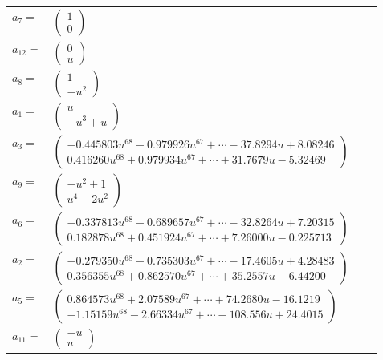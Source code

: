 \documentclass[1p]{elsarticle_modified}
\theoremstyle{definition}
\begin{document}
\begin{tabular}{m{7pt} m{180pt} m{7pt} m{180pt} }
\flushright $a_{7}=$&$\begin{pmatrix}1\\0\end{pmatrix}$ \\
\flushright $a_{12}=$&$\begin{pmatrix}0\\u\end{pmatrix}$ \\
\flushright $a_{8}=$&$\begin{pmatrix}1\\- u^2\end{pmatrix}$ \\
\flushright $a_{1}=$&$\begin{pmatrix}u\\- u^3+u\end{pmatrix}$ \\
\flushright $a_{3}=$&$\begin{pmatrix}-0.445803 u^{68}-0.979926 u^{67}+\cdots-37.8294 u+8.08246\\0.416260 u^{68}+0.979934 u^{67}+\cdots+31.7679 u-5.32469\end{pmatrix}$ \\
\flushright $a_{9}=$&$\begin{pmatrix}- u^2+1\\u^4-2 u^2\end{pmatrix}$ \\
\flushright $a_{6}=$&$\begin{pmatrix}-0.337813 u^{68}-0.689657 u^{67}+\cdots-32.8264 u+7.20315\\0.182878 u^{68}+0.451924 u^{67}+\cdots+7.26000 u-0.225713\end{pmatrix}$ \\
\flushright $a_{2}=$&$\begin{pmatrix}-0.279350 u^{68}-0.735303 u^{67}+\cdots-17.4605 u+4.28483\\0.356355 u^{68}+0.862570 u^{67}+\cdots+35.2557 u-6.44200\end{pmatrix}$ \\
\flushright $a_{5}=$&$\begin{pmatrix}0.864573 u^{68}+2.07589 u^{67}+\cdots+74.2680 u-16.1219\\-1.15159 u^{68}-2.66334 u^{67}+\cdots-108.556 u+24.4015\end{pmatrix}$ \\
\flushright $a_{11}=$&$\begin{pmatrix}- u\\u\end{pmatrix}$ \\

\end{tabular}
\end{document}
